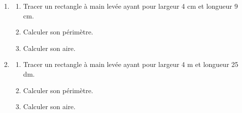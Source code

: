\documentclass[exercice]{thedocument}%
\begin{document}
%
\begin{enumerate}
    \item \begin{enumerate}
        \item Tracer un rectangle à main levée ayant pour largeur 4 cm et longueur 9 cm.
        \item Calculer son périmètre.
        \item Calculer son aire.
    \end{enumerate}
    \item \begin{enumerate}
        \item Tracer un rectangle à main levée ayant pour largeur 4 m et longueur 25 dm.
        \item Calculer son périmètre.
        \item Calculer son aire.
    \end{enumerate}
\end{enumerate}
\end{document}
